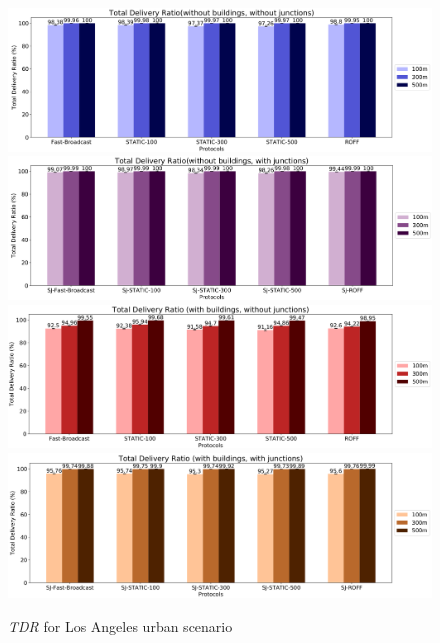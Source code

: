 		\begin{figure}[H]
			\centering
			\includegraphics[width=1.0\textwidth]{immagini/la-25/b0/j0/tdr}
			\includegraphics[width=1.0\textwidth]{immagini/la-25/b0/j1/tdr}
			\includegraphics[width=1.0\textwidth]{immagini/la-25/b1/j0/tdr}
			\includegraphics[width=1.0\textwidth]{immagini/la-25/b1/j1/tdr}
			\caption{\textit{TDR} for Los Angeles urban scenario}
			\label{fig:la-25-tdr}
		\end{figure}
		
	

	